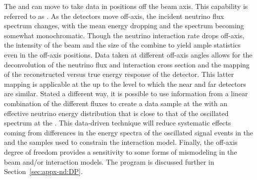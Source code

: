 The  and  can move to take data in positions off the beam axis.  This capability is referred to as . As the detectors move off-axis, the incident neutrino flux spectrum changes, with the mean energy dropping and the spectrum becoming somewhat monochromatic.  Though the neutrino interaction rate drops off-axis, the intensity of the beam and the size of the   combine to yield ample statistics even in the off-axis positions. 
Data taken at different off-axis angles allows for the deconvolution of the neutrino flux and interaction cross section and the mapping of the reconstructed versus true energy response of the detector.  This latter mapping is applicable at the  up to the level to which the near and far  detectors are similar.  Stated a different way, it is possible to use information from a linear combination of the different fluxes to create a data sample at the  with an effective neutrino energy distribution that is close to that of the oscillated spectrum at the .  This data-driven technique will reduce systematic effects coming from differences in the energy spectra of the oscillated signal events in the  and the  samples used to constrain the interaction model. Finally, the off-axis degree of freedom provides a sensitivity to some forms of mismodeling in the beam and/or interaction models. The  program is discussed further in Section~\ref{sec:appx-nd:DP}.


